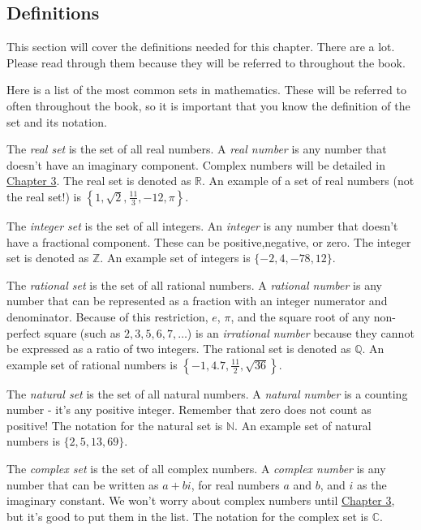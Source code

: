 \documentclass[../book.tex]{subfiles}
\begin{document}
\subsection{Definitions}
This section will cover the definitions needed for this chapter.  There are a lot.  Please read through them because they will be referred to throughout the book.  

Here is a list of the most common sets in mathematics.  These will be referred to often throughout the book, so it is important that you know the definition of the set and its notation.

The \textit{real set} is the set of all real numbers.  A \textit{real number} is any number that doesn't have an imaginary component.  Complex numbers will be detailed in \hyperlink{chapter.3}{Chapter 3}.  The real set is denoted as $\mathbb{R}$.  An example of a set of real numbers (not the real set!) is $\displaystyle \left\{1,\sqrt{2},\frac{11}{3},-12,\pi\right\}$.

The \textit{integer set} is the set of all integers.  An \textit{integer} is any number that doesn't have a fractional component.  These can be positive,negative, or zero.  The integer set is denoted as $\mathbb{Z}$.  An example set of integers is $\{-2,4,-78,12\}$.

The \textit{rational set} is the set of all rational numbers.  A \textit{rational number} is any number that can be represented as a fraction with an integer numerator and denominator.  Because of this restriction, $e$, $\pi$, and the square root of any non-perfect square (such as $2,3,5,6,7,\ldots$) is an \textit{irrational number} because they cannot be expressed as a ratio of two integers.  The rational set is denoted as $\mathbb{Q}$.  An example set of rational numbers is $\displaystyle \left\{-1,4.7,\frac{11}{2},\sqrt{36}\right\}$.

The \textit{natural set} is the set of all natural numbers.  A \textit{natural number} is a counting number - it's any positive integer.  Remember that zero does not count as positive! The notation for the natural set is $\mathbb{N}$.  An example set of natural numbers is $\{2,5,13,69\}$.

The \textit{complex set} is the set of all complex numbers.  A \textit{complex number} is any number that can be written as $a+bi$, for real numbers $a$ and $b$, and $i$ as the imaginary constant.  We won't worry about complex numbers until \hyperlink{chapter.3}{Chapter 3}, but it's good to put them in the list.  The notation for the complex set is $\mathbb{C}$.
\end{document}
